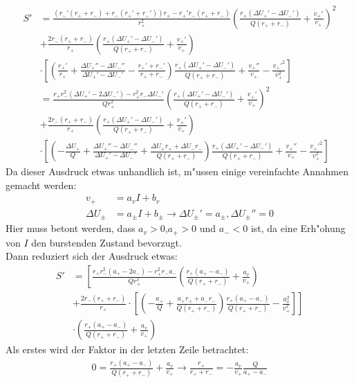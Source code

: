 \documentclass[12pt,a4paper]{article}
\begin{document}
\begin{align*}
S'&=\frac{(r_-'(r_++r_-)+r_-(r_+'+r_-'))r_+-r_+'r_-(r_++r_-)}{r_+^2}\left(\frac{r_+(\Delta U_+'-\Delta U_-')}{Q(r_++r_-)}+\frac{v_+'}{v_+}\right)^2\\
&+\frac{2r_-(r_++r_-)}{r_+}\left(\frac{r_+(\Delta U_+'-\Delta U_-')}{Q(r_++r_-)}+\frac{v_+'}{v_+}\right) \\&\cdot \left[\left(\frac{r_+'}{r_+}+\frac{\Delta U_+''-\Delta U_-''}{\Delta U_+'-\Delta U_-'}-\frac{r_+'+r_-'}{r_++r_-}\right)\frac{r_+(\Delta U_+'-\Delta U_-')}{Q(r_++r_-)}+\frac{v_+''}{v_+}-\frac{v_+'^2}{v_+^2}\right]\\
&=\frac{r_+r_-^2(\Delta U_+'-2\Delta U_-')-r_+^2r_-\Delta U_-'}{Qr_+^2}\left(\frac{r_+(\Delta U_+'-\Delta U_-')}{Q(r_++r_-)}+\frac{v_+'}{v_+}\right)^2\\
&+\frac{2r_-(r_++r_-)}{r_+}\left(\frac{r_+(\Delta U_+'-\Delta U_-')}{Q(r_++r_-)}+\frac{v_+'}{v_+}\right) \\&\cdot \left[\left(-\frac{\Delta U_+}{Q}+\frac{\Delta U_+''-\Delta U_-''}{\Delta U_+'-\Delta U_-'}+\frac{\Delta U_+r_++\Delta U_-r_-}{Q(r_++r_-)}\right)\frac{r_+(\Delta U_+'-\Delta U_-')}{Q(r_++r_-)}+\frac{v_+''}{v_+}-\frac{v_+'^2}{v_+^2}\right]
\end{align*}
Da dieser Ausdruck etwas unhandlich ist, m"ussen einige vereinfachte Annahmen gemacht werden:
\begin{align*}
v_+&=a_vI+b_v\\
\Delta U_\pm&=a_\pm I+b_\pm\rightarrow\Delta U_\pm'=a_\pm,\Delta U_\pm''=0
\end{align*}
Hier muss betont werden, dass $a_v>0$,$a_+>0$ und $a_-<0$ ist, da eine Erh"ohung von $I$ den burstenden Zustand bevorzugt.\\ 
Dann reduziert sich der Ausdruck etwas:
\begin{align*}
S'&=\left[\frac{r_+r_-^2(a_+-2a_-)-r_+^2r_-a_-}{Qr_+^2}\left(\frac{r_+(a_+-a_-)}{Q(r_++r_-)}+\frac{a_v}{v_+}\right)\right.\\
&+\left.\frac{2r_-(r_++r_-)}{r_+}\cdot \left[\left(-\frac{a_+}{Q}+\frac{a_+r_++a_-r_-}{Q(r_++r_-)}\right)\frac{r_+(a_+-a_-)}{Q(r_++r_-)}-\frac{a_v^2}{v_+^2}\right]\right]\\
&\cdot\left(\frac{r_+(a_+-a_-)}{Q(r_++r_-)}+\frac{a_v}{v_+}\right)
\end{align*}
Als erstes wird der Faktor in der letzten Zeile betrachtet:
\begin{eqnarray}
0=\frac{r_+(a_+-a_-)}{Q(r_++r_-)}+\frac{a_v}{v_+}\rightarrow\frac{r_+}{r_++r_-}=-\frac{a_v}{v_+}\frac{Q}{a_+-a_-}
\end{eqnarray}
\end{document}
